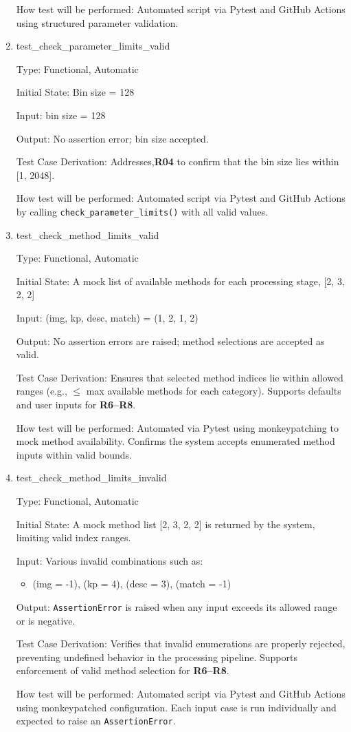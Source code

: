 \documentclass[12pt, titlepage]{article}
\begin{document}
\begin{enumerate}
How test will be performed: Automated script via Pytest and GitHub Actions using structured parameter validation.

\item{test\_check\_parameter\_limits\_valid\\}

Type: Functional, Automatic

Initial State: Bin size = 128

Input: bin size = 128

Output: No assertion error; bin size accepted.

Test Case Derivation: Addresses,\textbf{R04} to confirm that the bin size lies within [1, 2048].

How test will be performed: Automated script via Pytest and GitHub Actions by calling \texttt{check\_parameter\_limits()} with all valid values.
  
\item{test\_check\_method\_limits\_valid\\}

Type: Functional, Automatic

Initial State: A mock list of available methods for each processing stage, [2, 3, 2, 2] 

Input: (img, kp, desc, match) = (1, 2, 1, 2)

Output: No assertion errors are raised; method selections are accepted as valid.

Test Case Derivation: Ensures that selected method indices lie within allowed ranges (e.g., $\leq$ max available methods for each category). Supports defaults and user inputs for \textbf{R6–R8}.

How test will be performed: Automated via Pytest using monkeypatching to mock method availability. Confirms the system accepts enumerated method inputs within valid bounds.

\item{test\_check\_method\_limits\_invalid\\}

Type: Functional, Automatic

Initial State: A mock method list [2, 3, 2, 2] is returned by the system, limiting valid index ranges.

Input: Various invalid combinations such as:
\begin{itemize}
  \item (img = -1), (kp = 4), (desc = 3), (match = -1)
\end{itemize}

Output: \texttt{AssertionError} is raised when any input exceeds its allowed range or is negative.

Test Case Derivation: Verifies that invalid enumerations are properly rejected, preventing undefined behavior in the processing pipeline. Supports enforcement of valid method selection for \textbf{R6–R8}.

How test will be performed: Automated script via Pytest and GitHub Actions using monkeypatched configuration. Each input case is run individually and expected to raise an \texttt{AssertionError}.


\end{enumerate}
\end{document}
